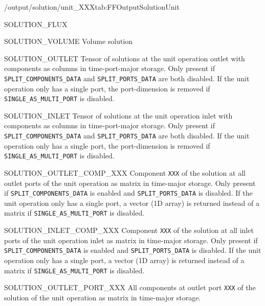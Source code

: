 \begin{groupscope}{/output/solution/unit\_XXX}{tab:FFOutputSolutionUnit}
\begin{dataset}[type=double,unit={\si{\mol\per\square\metre\per\second}}]{SOLUTION\_FLUX}
  \end{dataset}
  \begin{dataset}[type=double,unit={\si{\cubic\metre}}]{SOLUTION\_VOLUME}
    Volume solution
  \end{dataset}
  \begin{dataset}[type=double,unit={\si{\mol\per\cubic\metre\of{IV}}}]{SOLUTION\_OUTLET}
    Tensor of solutions at the unit operation outlet with components as columns in time-port-major storage.
    Only present if \texttt{SPLIT\_COMPONENTS\_DATA} and \texttt{SPLIT\_PORTS\_DATA} are both disabled.
    If the unit operation only has a single port, the port-dimension is removed if \texttt{SINGLE\_AS\_MULTI\_PORT} is disabled.
  \end{dataset}
  \begin{dataset}[type=double,unit={\si{\mol\per\cubic\metre\of{IV}}}]{SOLUTION\_INLET}
    Tensor of solutions at the unit operation inlet with components as columns in time-port-major storage.
    Only present if \texttt{SPLIT\_COMPONENTS\_DATA} and \texttt{SPLIT\_PORTS\_DATA} are both disabled.
    If the unit operation only has a single port, the port-dimension is removed if \texttt{SINGLE\_AS\_MULTI\_PORT} is disabled.
  \end{dataset}
  \begin{dataset}[type=double,unit={\si{\mol\per\cubic\metre\of{IV}}}]{SOLUTION\_OUTLET\_COMP\_XXX}
    Component \texttt{XXX} of the solution at all outlet ports of the unit operation as matrix in time-major storage.
    Only present if \texttt{SPLIT\_COMPONENTS\_DATA} is enabled and \texttt{SPLIT\_PORTS\_DATA} is disabled.
    If the unit operation only has a single port, a vector (1D array) is returned instead of a matrix if \texttt{SINGLE\_AS\_MULTI\_PORT} is disabled.
  \end{dataset}
  \begin{dataset}[type=double,unit={\si{\mol\per\cubic\metre\of{IV}}}]{SOLUTION\_INLET\_COMP\_XXX}
    Component \texttt{XXX} of the solution at all inlet ports of the unit operation inlet as matrix in time-major storage.
    Only present if \texttt{SPLIT\_COMPONENTS\_DATA} is enabled and \texttt{SPLIT\_PORTS\_DATA} is disabled.
    If the unit operation only has a single port, a vector (1D array) is returned instead of a matrix if \texttt{SINGLE\_AS\_MULTI\_PORT} is disabled.
  \end{dataset}
  \begin{dataset}[type=double,unit={\si{\mol\per\cubic\metre\of{IV}}}]{SOLUTION\_OUTLET\_PORT\_XXX}
    All components at outlet port \texttt{XXX} of the solution of the unit operation as matrix in time-major storage.

\end{dataset}
\end{groupscope}
